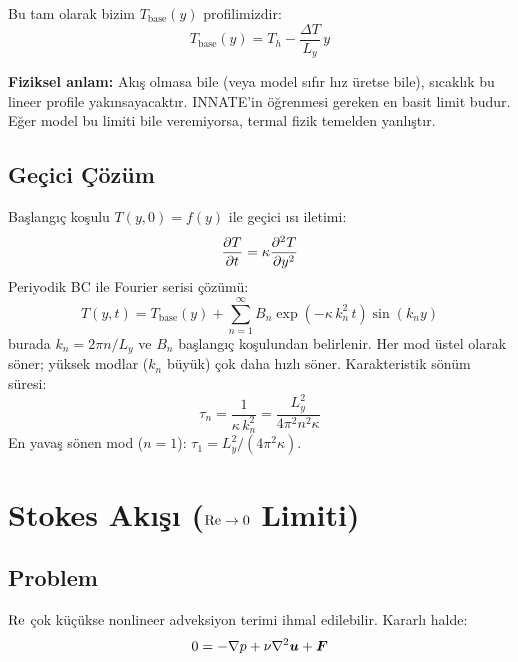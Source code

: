 Bu tam olarak bizim $T_{\text{base}}(y)$ profilimizdir:
\begin{equation}
    \boxed{T_{\text{base}}(y) = T_h - \frac{\Delta T}{L_y} \, y}
    \label{eq:tbase}
\end{equation}

\textbf{Fiziksel anlam:} Akış olmasa bile (veya model sıfır hız üretse bile), sıcaklık bu lineer profile yakınsayacaktır. INNATE'in öğrenmesi gereken en basit limit budur. Eğer model bu limiti bile veremiyorsa, termal fizik temelden yanlıştır.

\subsection{Geçici Çözüm}

Başlangıç koşulu $T(y, 0) = f(y)$ ile geçici ısı iletimi:
\begin{equation}
    \frac{\partial T}{\partial t} = \kappa \frac{\partial^2 T}{\partial y^2}
\end{equation}
Periyodik BC ile Fourier serisi çözümü:
\begin{equation}
    T(y, t) = T_{\text{base}}(y) + \sum_{n=1}^{\infty} B_n \exp\!\left( -\kappa \, k_n^2 \, t \right) \sin(k_n y)
    \label{eq:transient_heat}
\end{equation}
burada $k_n = 2\pi n / L_y$ ve $B_n$ başlangıç koşulundan belirlenir. Her mod üstel olarak söner; yüksek modlar ($k_n$ büyük) çok daha hızlı söner. Karakteristik sönüm süresi:
\begin{equation}
    \tau_n = \frac{1}{\kappa \, k_n^2} = \frac{L_y^2}{4\pi^2 n^2 \kappa}
\end{equation}
En yavaş sönen mod ($n=1$): $\tau_1 = L_y^2/(4\pi^2 \kappa)$.


\section{Stokes Akışı ($\mathrm{Re} \to 0$ Limiti)}
\label{sec:stokes}

\subsection{Problem}

$\mathrm{Re}$ çok küçükse nonlineer adveksiyon terimi ihmal edilebilir. Kararlı halde:
\begin{equation}
    0 = -\nabla p + \nu \nabla^2 \bm{u} + \bm{F}
    \label{eq:stokes}
\end{equation}

